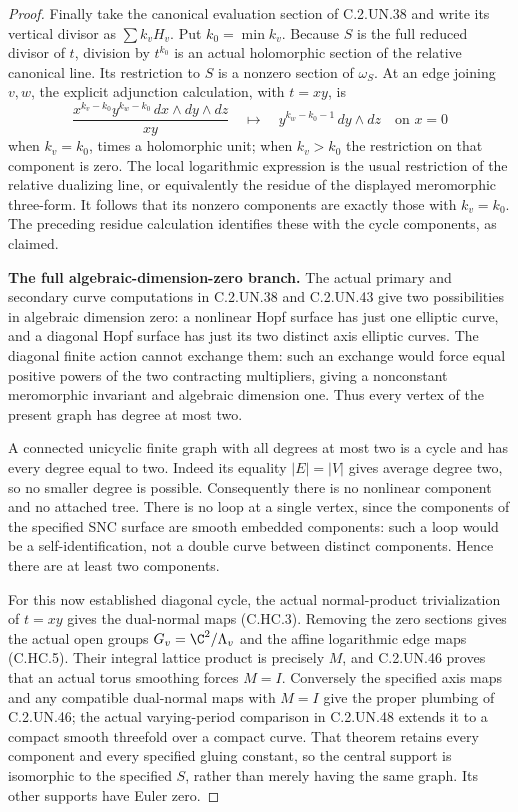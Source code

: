\begin{proof}
Finally take the canonical evaluation section of C.2.UN.38 and
write its vertical divisor as $\sum k_vH_v$. Put $k_0=\min k_v$.
Because $S$ is the full reduced divisor of $t$, division by
$t^{k_0}$ is an actual holomorphic section of the relative
canonical line. Its restriction to $S$ is a nonzero section of
$\omega_S$. At an edge joining $v,w$, the explicit adjunction
calculation, with $t=xy$, is
\[
 \frac{x^{k_v-k_0}y^{k_w-k_0}\,dx\wedge dy\wedge dz}{xy}
 \quad\longmapsto\quad
 y^{k_w-k_0-1}\,dy\wedge dz\quad\text{on }x=0
                                                        \tag{C.HR.8}
\]
when $k_v=k_0$, times a holomorphic unit; when $k_v>k_0$ the
restriction on that component is zero. The local logarithmic
expression is the usual restriction of the relative dualizing
line, or equivalently the residue of the displayed meromorphic
three-form. It follows that its nonzero components are exactly
those with $k_v=k_0$. The preceding residue calculation identifies
these with the cycle components, as claimed.

\par\medskip\noindent\textbf{The full algebraic-dimension-zero branch.}
The actual primary and secondary curve computations in
C.2.UN.38 and C.2.UN.43 give two possibilities in algebraic
dimension zero: a nonlinear Hopf surface has just one elliptic
curve, and a diagonal Hopf surface has just its two distinct
axis elliptic curves. The diagonal finite action cannot exchange
them: such an exchange would force equal positive powers of the
two contracting multipliers, giving a nonconstant meromorphic
invariant and algebraic dimension one. Thus every vertex of the
present graph has degree at most two.

A connected unicyclic finite graph with all degrees at most two
is a cycle and has every degree equal to two. Indeed its equality
$|E|=|V|$ gives average degree two, so no smaller degree is possible.
Consequently there is no nonlinear component and no attached
tree. There is no loop at a single vertex, since the components
of the specified SNC surface are smooth embedded components:
such a loop would be a self-identification, not a double curve
between distinct components. Hence there are at least two
components.

For this now established diagonal cycle, the actual normal-product
trivialization of $t=xy$ gives the dual-normal maps
(C.HC.3). Removing the zero sections gives the actual open groups
$G_v=\C^2/\Lambda_v$ and the affine logarithmic edge maps
(C.HC.5). Their integral lattice product is precisely $M$, and
C.2.UN.46 proves that an actual torus smoothing forces $M=I$.
Conversely the specified axis maps and any compatible dual-normal
maps with $M=I$ give the proper plumbing of C.2.UN.46; the actual
varying-period comparison in C.2.UN.48 extends it to a compact
smooth threefold over a compact curve. That theorem retains every
component and every specified gluing constant, so the central
support is isomorphic to the specified $S$, rather than merely
having the same graph. Its other supports have Euler zero.


\end{proof}
